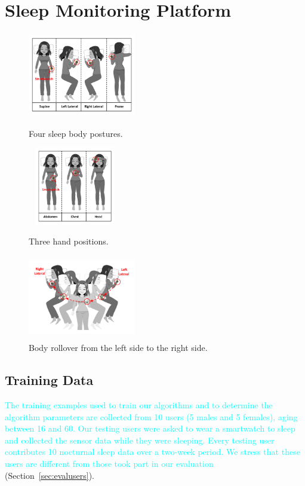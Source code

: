 \section{\systemname Sleep Monitoring Platform}\label{Sec:3design}





\begin{figure}
	\centering
	\begin{minipage}[t]{.33\textwidth}
		\centering
		  \includegraphics[width=4.7cm,height=3.7cm]{Figures/BodyPosture.pdf}
		\caption{Four sleep body postures.}
		\label{fig:BodyPosture}
	\end{minipage}%
	\begin{minipage}[t]{.33\textwidth}
		\centering
		\includegraphics[width=4.1cm,height=3.4cm]{Figures/HandPosition.pdf}
		\caption{Three hand positions.}
		\label{fig:HandPosition}		
	\end{minipage}
\begin{minipage}[t]{.33\textwidth}
		\centering
	\includegraphics[width=4.7cm,height=3.7cm]{Figures/BodyRollover.pdf}
	\caption{Body rollover from the left side to the right side.}
	\label{fig:BodyRollover}
\end{minipage}
\end{figure}


\subsection{Training Data\label{sec:trainingdata}}
\textcolor{cyan}{ The training examples used to train our algorithms and to determine the algorithm parameters are collected from 10 users
(5 males and 5 females), aging between 16 and 60. Our testing users were asked to wear a smartwatch to sleep and collected the sensor data
while they were sleeping. Every testing user contributes 10 nocturnal sleep data over a two-week period. We stress that these users are
different from those took part in our evaluation} (Section~\ref{sec:evalusers}).

